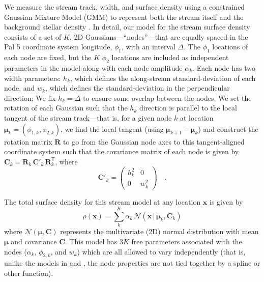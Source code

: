 \documentclass[twocolumn]{aastex62}
\newcommand{\bs}[1]{\boldsymbol{#1}}
\newcommand{\given}{\,|\,}
\newcommand{\transpose}[1]{{#1}^{\!\mathsf{T}}}
\newcommand{\mat}[1]{\mathbf{#1}}
\begin{document}
We measure the stream track, width, and surface density using a constrained Gaussian Mixture Model (GMM) to represent both the stream itself and the background stellar density \citep[our model is similar to, but more flexible than, past work that use GMMs to model streams][]{Erkal:2017, Koposov:2019}.
In detail, our model for the stream surface density consists of a set of $K$, 2D Gaussians---``nodes''---that are equally spaced in the Pal 5 coordinate system longitude, $\phi_1$, with an interval $\Delta$.
The $\phi_1$ locations of each node are fixed, but the $K$ $\phi_2$ locations are included as independent parameters in the model along with each node amplitude $\alpha_k$.
Each node has two width parameters: $h_k$, which defines the along-stream standard-deviation of each node, and $w_k$, which defines the standard-deviation in the perpendicular direction; We fix $h_k = \Delta$ to ensure some overlap between the nodes.
We set the rotation of each Gaussian such that the $h_k$ direction is parallel to the local tangent of the stream track---that is, for a given node $k$ at location $\bs{\mu}_k = (\phi_{1,k}, \phi_{2,k})$, we find the local tangent (using $\bs{\mu}_{k+1} - \bs{\mu}_k$) and construct the rotation matrix $\mat{R}$ to go from the Gaussian node axes to this tangent-aligned coordinate system such that the covariance matrix of each node is given by $\mat{C}_k = \mat{R}_k \, \mat{C}'_k \, \transpose{\mat{R}}_k$, where
\begin{equation}
    \mat{C}'_k =
    \begin{pmatrix}
        h_k^2 & 0 \\
        0 & w_k^2
    \end{pmatrix} \quad .
\end{equation}

The total surface density for this stream model at any location $\bs{x}$ is given by
\begin{equation}
    \rho(\bs{x}) = \sum_k^K \alpha_k \, \mathcal{N}(\bs{x} \given \bs{\mu}_k, \mat{C}_k)
\end{equation}
where $\mathcal{N}(\bs{\mu}, \mat{C})$ represents the multivariate (2D) normal distribution with mean $\bs{\mu}$ and covariance $\mat{C}$.
This model has $3 K$ free parameters associated with the nodes ($\alpha_k$, $\phi_{2, k}$, and $w_k$) which are all allowed to vary independently (that is, unlike the models in \cite{Erkal:2017} and \cite{Koposov:2019}, the node properties are not tied together by a spline or other function).
\end{document}
